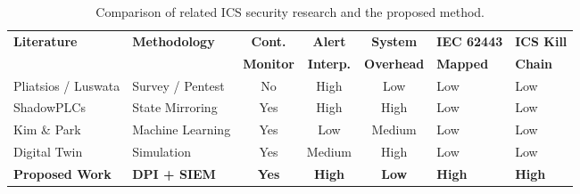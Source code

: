 \begin{table}[htbp]
\centering
\footnotesize %
\setlength{\tabcolsep}{2pt} %
\begin{tabular}{@{} p{2.8cm} p{2.2cm} c c c p{2.2cm} p{1.6cm} @{}}
\hline
\textbf{Literature} & \textbf{Methodology} & \textbf{Cont.} & \textbf{Alert} & \textbf{System} & \textbf{IEC 62443} & \textbf{ICS Kill} \\
 & & \textbf{Monitor} & \textbf{Interp.} & \textbf{Overhead} & \textbf{Mapped} & \textbf{Chain} \\ \hline
Pliatsios \cite{ref_report25} / \newline Luswata \cite{ref_report27} & Survey / \newline Pentest & No & High & Low & Low & Low \\ 
ShadowPLCs \cite{ref_report28} & State \newline Mirroring & Yes & High & High & Low & Low \\ 
Kim \& Park \cite{ref_report29} & Machine \newline Learning & Yes & Low & Medium & Low & Low \\ 
Digital Twin \cite{ref_report30} & Simulation & Yes & Medium & High & Low & Low \\ \hline
\textbf{Proposed Work} & \textbf{DPI + SIEM} & \textbf{Yes} & \textbf{High} & \textbf{Low} & \textbf{High} & \textbf{High} \\ \hline
\end{tabular}

\caption{Comparison of related ICS security research and the proposed method.}
\label{tab:comparison}
\end{table}

